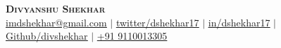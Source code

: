 \documentclass[letterpaper,11pt]{article}
\makeatletter
\newcommand{\resumeItem}[1]{
  \item\small{
    {#1 \vspace{-2pt}}
  }
}
\newcommand{\resumeSubheading}[4]{
  \vspace{-2pt}\item
    \begin{tabular*}{0.97\textwidth}[t]{l@{\extracolsep{\fill}}r}
      \textbf{#1} & #2 \\
      \textit{\small#3} & \textit{\small #4} \\
    \end{tabular*}\vspace{-7pt}
}
\newcommand{\resumeSubSubheading}[2]{
    \item
    \begin{tabular*}{0.97\textwidth}{l@{\extracolsep{\fill}}r}
      \textit{\small#1} & \textit{\small #2} \\
    \end{tabular*}\vspace{-7pt}
}
\newcommand{\resumeSubHeadingListStart}{\begin{itemize}[leftmargin=0.15in, label={}]}
\newcommand{\resumeSubHeadingListEnd}{\end{itemize}}
\newcommand{\resumeItemListStart}{\begin{itemize}}
\newcommand{\resumeItemListEnd}{\end{itemize}\vspace{-5pt}}
\makeatother
\begin{document}

\begin{center}
    \textbf{\Huge \scshape Divyanshu Shekhar} \\ \vspace{1pt}
    \href{mailto:imdshekhar@gmail.com}{\underline{imdshekhar@gmail.com}} $|$ 
    \href{https://twitter.com/dshekhar17}{\underline{twitter/dshekhar17}} $|$ 
    \href{https://linkedin.com/in/dshekhar17}{\underline{in/dshekhar17}} $|$
    \href{https://github.com/divshekhar}{\underline{Github/divshekhar}} $|$
    \underline{+91 9110013305}
    
\end{center}


        
    
       
\end{document}
